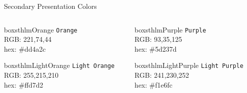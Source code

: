 \documentclass[newPxFont]{beamer}
\begin{document}

\begin{frame}[c]{Secondary Presentation Colors}

\begin{columns}[c]

\begin{column}{0.23\textwidth}
\begin{beamercolorbox}[wd=\linewidth,ht=10ex,dp=3ex]{boxsthlmOrange}
\centering
	\texttt{Orange}\\
	\vspace{1em}
	\tiny{RGB:  221,74,44} \\
	\tiny{hex: \#dd4a2c}
\end{beamercolorbox}

\vspace{3em}

\begin{beamercolorbox}[wd=\linewidth,ht=10ex,dp=3ex]{boxsthlmLightOrange}
\centering
	\texttt{Light Orange}\\
	\vspace{1em}
	\tiny{RGB:  255,215,210} \\
	\tiny{hex: \#ffd7d2}
\end{beamercolorbox}

\end{column}

\begin{column}{0.23\textwidth}
\begin{beamercolorbox}[wd=\linewidth,ht=10ex,dp=3ex]{boxsthlmPurple}
\centering
	\texttt{Purple}\\
	\vspace{1em}
	\tiny{RGB:  93,35,125} \\
	\tiny{hex: \#5d237d}
\end{beamercolorbox}

\vspace{3em}

\begin{beamercolorbox}[wd=\linewidth,ht=10ex,dp=3ex]{boxsthlmLightPurple}
\centering
	\texttt{Light Purple}\\
	\vspace{1em}
	\tiny{RGB:  241,230,252} \\
	\tiny{hex: \#f1e6fc}
\end{beamercolorbox}
\end{column}


\end{columns}
\end{frame}
\end{document}
